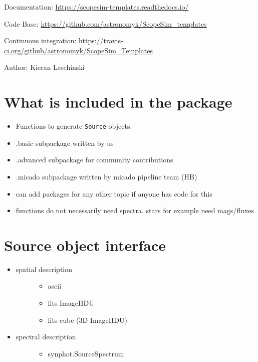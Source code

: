 
Documentation: \url{https://scopesim-templates.readthedocs.io/}

Code Base: \url{https://github.com/astronomyk/ScopeSim_templates}

Continuous integration: \url{https://travis-ci.org/github/astronomyk/ScopeSim_Templates}

Author: Kieran Leschinski


\section{What is included in the package%
  \label{what-is-included-in-the-package}%
}

\begin{itemize}
\item Functions to generate \texttt{Source} objects.

\item .basic subpackage written by us

\item .advanced subpackage for community contributions

\item .micado subpackage written by micado pipeline team (HB)

\item can add packages for any other topic if anyone has code for this

\item functions do not necessarily need spectra. stars for example need mags/fluxes
\end{itemize}


\section{Source object interface%
  \label{source-object-interface}%
}

\begin{itemize}
\item 
\begin{description}
\item[{spatial description}] \leavevmode 
\begin{itemize}
\item ascii

\item fits ImageHDU

\item fits cube (3D ImageHDU)
\end{itemize}

\end{description}

\item 
\begin{description}
\item[{spectral description}] \leavevmode 
\begin{itemize}
\item synphot.SourceSpectrum
\end{itemize}

\end{description}
\end{itemize}



